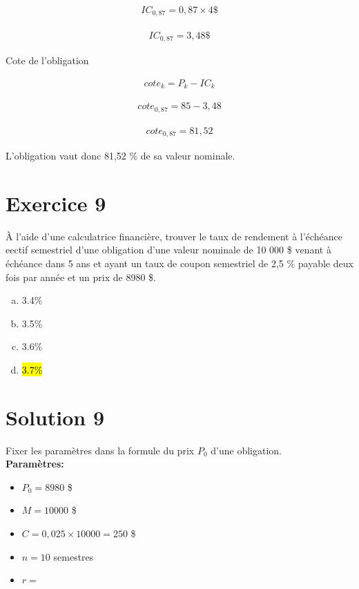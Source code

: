 \documentclass[10pt,a4paper]{article}
\begin{document}
\begin{align*}
IC_{0,87} = 0,87 \times 4 \$
\end{align*}

\begin{align*}
IC_{0,87} = 3,48 \$
\end{align*}

Cote de l'obligation 

\begin{align*}
cote_k = P_k - IC_k
\end{align*}

\begin{align*}
cote_{0,87} = 85 - 3,48
\end{align*}

\begin{align*}
cote_{0,87} = 81,52
\end{align*}

L'obligation vaut donc 81,52 \% de sa valeur nominale.

\newpage


\section*{Exercice 9}
À l'aide d'une calculatrice financière, trouver le taux de rendement à l’échéance eectif semestriel d’une obligation d’une valeur nominale de 10 000 \$ venant à échéance dans 5 ans et ayant un taux de coupon semestriel de 2,5 \% payable deux fois par année et un prix de 8980 \$.

\begin{enumerate}[a)]
\item 3.4\%
\item 3.5\%
\item 3.6\%
\item \hl{3.7\%}
\end{enumerate}

\section*{Solution 9}
Fixer les paramètres  dans la formule du prix $P_0$ d'une obligation.\\

\textbf{Paramètres:}
\begin{itemize}
\item $P_0 = 8980$ \$
\item $M = 10 000$ \$
\item $C = 0,025 \times 10000 = 250$ \$
\item $n = 10$ semestres
\item $r =$ \?
\end{itemize}
\end{document}
